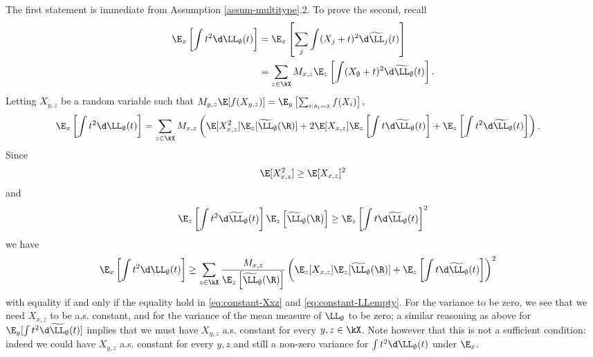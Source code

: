 \documentclass[10pt,a4paper]{article}
\renewcommand{\kx}{s}
\begin{document}
The first statement is immediate from Assumption \ref{assum-multitype}.2. 
To prove the second, recall
\begin{align*}
\E_x\left[\int t^2 \d\LL_\emptyset(t) \right] &= \E_x\left[\sum_{j} \int (X_j+t)^2 \d\widetilde\LL_j(t) \right] \\
&= \sum_{z\in\kX} M_{x,z} \E_z\left[ \int (X_\emptyset+t)^2 \d\widetilde\LL_\emptyset(t) \right] .
\end{align*}
Letting $X_{y,z}$ be a random variable such that $M_{y,z} \E[f(X_{y,z})] = \E_y\left[\sum_{i: \kx_i = z} f(X_i)\right]$, 
\begin{align*}
\E_x\left[\int t^2 \d\LL_\emptyset(t) \right] &= \sum_{z\in\kX} M_{x,z} \left( \E[X_{x,z}^2] \E_z[\widetilde\LL_\emptyset(\R)] + 2 \E[X_{x,z}] \E_z\left[\int t \d\widetilde\LL_\emptyset(t)\right] + \E_z\left[\int t^2 \d\widetilde\LL_\emptyset(t)\right] \right) . 
\end{align*}
Since 
\begin{equation}\label{eq:constant-Xxz}
\E[X_{x,z}^2] \geq \E[X_{x,z}]^2
\end{equation}
and
\begin{equation}\label{eq:constant-LLempty}
\E_z\left[\int t^2 \d\widetilde\LL_\emptyset(t)\right]\E_z\left[\widetilde\LL_\emptyset(\R)\right] \geq \E_z\left[\int t \d\widetilde\LL_\emptyset(t)\right]^2 
\end{equation}
we have 
\begin{align*}
\E_x\left[\int t^2 \d\LL_\emptyset(t) \right] 
&\geq \sum_{z\in\kX} \frac{M_{x,z}}{\E_z\left[\widetilde\LL_\emptyset(\R)\right]} \left( \E_z[X_{x,z}] \E_z[\widetilde\LL_\emptyset(\R)] + \E_z\left[\int t \d\widetilde\LL_\emptyset(t)\right] \right)^2
\end{align*}
with equality if and only if the equality hold in \eqref{eq:constant-Xxz} and \eqref{eq:constant-LLempty}. For the variance to be zero, we see that we need $X_{x,z}$ to be a.s. constant, and for the variance of the mean measure of $\LL_\emptyset$ to be zero; a similar reasoning as above for $\E_y[\int t^2\d\widetilde\LL_\emptyset(t)]$ implies that we must have $X_{y,z}$ a.s. constant for every $y,z\in\kX$. Note however that this is not a sufficient condition: indeed we could have $X_{y,z}$ a.s. constant for every $y,z$ and still a non-zero variance for $\int t^2\d\LL_\emptyset(t)$ under $\E_x$. 
\end{document}
